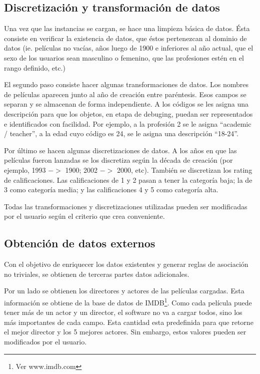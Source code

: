 \documentclass[journal]{IEEEtran}
\begin{document}
\subsection{Discretización y transformación de datos}
Una vez que las instancias se cargan, se hace una limpieza básica de datos.
Ésta consiste en verificar la existencia de datos, que éstos pertenezcan
al dominio de datos (ie. películas no vacías, años luego de 1900 e inferiores
al año actual, que el sexo de los usuarios sean masculino o femenino, que las
profesiones estén en el rango definido, etc.)

El segundo paso consiste hacer algunas transformaciones de datos. Los nombres
de películas aparecen junto al año de creación entre paréntesis. Esos campos se 
separan y se almacenan de forma independiente. A los códigos se les
asigna una descripción para que los objetos, en etapa de debuging, 
puedan ser representados e identificados con facilidad. Por ejemplo, a la profesión 2 se 
le asigna ``academic / teacher'', a la edad cuyo código es 24, se le asigna
una descripción ``18-24''.

Por último se hacen algunas discretizaciones de datos. A los años en que
las películas fueron lanzadas se los discretiza según la década de creación
 (por ejemplo, 1993 $-$$>$ 1900; 2002 $-$$>$ 2000, etc). 
También se discretizan los rating de calificaciones. Las calificaciones de
1 y 2 pasan a tener la categoría baja; la de 3 como categoría media; y las
calificaciones 4 y 5 como categoría alta. 

Todas las transformaciones y discretizaciones utilizadas pueden ser modificadas
por el usuario según el criterio que crea conveniente. 



\subsection{Obtención de datos externos}
Con el objetivo de enriquecer los datos existentes y generar reglas de asociación
no triviales, se obtienen de terceras partes datos adicionales.

Por un lado se obtienen los directores y actores de las películas cargadas. Esta información se
obtiene de la base de datos de IMDB\footnote{Ver www.imdb.com}. Como cada película puede
tener más de un actor y un director, el software no va a cargar todos, sino los más importantes
de cada campo. Esta cantidad esta predefinida para que retorne el mejor director y los 
5 mejores actores. Sin embargo, estos valores pueden ser modificados por el usuario.
\end{document}
